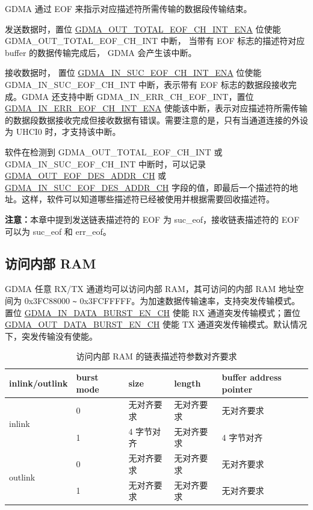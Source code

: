 \documentclass[main\_\_CN.tex]{subfiles}
\begin{document}
GDMA 通过 EOF 来指示对应描述符所需传输的数据段传输结束。

发送数据时，置位 \hyperref[fielddesc:DMAOUTTOTALEOFCHNINTENA]{GDMA\_OUT\_TOTAL\_EOF\_CH\_INT\_ENA} 位使能 GDMA\_OUT\_TOTAL\_EOF\_CH\_INT 中断， 当带有 EOF 标志的描述符对应 buffer 的数据传输完成后， GDMA 会产生该中断。

接收数据时， 置位 \hyperref[fielddesc:DMAINSUCEOFCHNINTENA]{GDMA\_IN\_SUC\_EOF\_CH\_INT\_ENA} 位使能 GDMA\_IN\_SUC\_EOF\_CH\_INT 中断，表示带有 EOF 标志的数据段接收完成。GDMA 还支持中断 GDMA\_IN\_ERR\_CH\_EOF\_INT，置位 \hyperref[fielddesc:DMAINERREOFCHNINTENA]{GDMA\_IN\_ERR\_EOF\_CH\_INT\_ENA} 使能该中断，表示对应描述符所需传输的数据段数据接收完成但接收数据有错误。需要注意的是，只有当通道连接的外设为 UHCI0 时，才支持该中断。

软件在检测到 GDMA\_OUT\_TOTAL\_EOF\_CH\_INT 或 GDMA\_IN\_SUC\_EOF\_CH\_INT 中断时，可以记录 \\\hyperref[fielddesc:DMAOUTEOFDESADDRCHN]{GDMA\_OUT\_EOF\_DES\_ADDR\_CH} 或 \hyperref[fielddesc:DMAINSUCEOFDESADDRCHN]{GDMA\_IN\_SUC\_EOF\_DES\_ADDR\_CH} 字段的值，即最后一个描述符的地址。这样，软件可以知道哪些描述符已经被使用并根据需要回收描述符。

{\bfseries 注意：}本章中提到发送链表描述符的 EOF 为 suc\_eof，接收链表描述符的 EOF 可以为 suc\_eof 和 err\_eof。

\subsection{访问内部 RAM}\label{sec:dma-access-inter-ram}
GDMA 任意 RX/TX 通道均可以访问内部 RAM，其可访问的内部 RAM 地址空间为 0x{}3FC88000 \verb+~+ 0x{}3FCFFFFF。为加速数据传输速率，支持突发传输模式。置位 \hyperref[fielddesc:DMAINDATABURSTENCHN]{GDMA\_IN\_DATA\_BURST\_EN\_CH} 使能 RX 通道突发传输模式；置位 \hyperref[fielddesc:DMAOUTDATABURSTENCHN]{GDMA\_OUT\_DATA\_BURST\_EN\_CH} 使能 TX 通道突发传输模式。默认情况下，突发传输没有使能。

\begin{longtable}[c]{ | l | l | l | l | l | }
    \caption{访问内部 RAM 的链表描述符参数对齐要求}
    \label{tab:gdma-inter-desc-param-align}
    \\\hline
    \rowcolor{lightgray}
    inlink/outlink & burst mode & size & length & buffer address pointer \\\hline

    \multirow{2}{*}{inlink}  & 0  & 无对齐要求 & 无对齐要求  & 无对齐要求 \\\cline{2-5}
     & 1 & 4 字节对齐   & 无对齐要求  & 4 字节对齐 \\\hline
    \multirow{2}{*}{outlink} & 0  & 无对齐要求 & 无对齐要求  & 无对齐要求 \\\cline{2-5}
     & 1 & 无对齐要求 & 无对齐要求  & 无对齐要求 \\\hline
\end{longtable}
\end{document}
